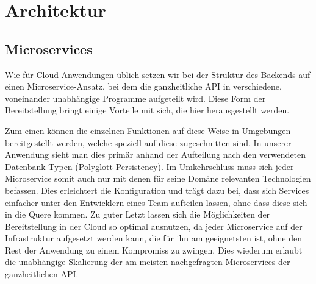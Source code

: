 \documentclass{article}
\begin{document}
\section{Architektur} %
\subsection{Microservices}

Wie für Cloud-Anwendungen üblich setzen wir bei der Struktur des Backends auf einen Microservice-Ansatz, bei dem die ganzheitliche API in verschiedene, voneinander unabhängige Programme aufgeteilt wird. Diese Form der Bereitstellung bringt einige Vorteile mit sich, die hier herausgestellt werden.

Zum einen können die einzelnen Funktionen auf diese Weise in Umgebungen bereitgestellt werden, welche speziell auf diese zugeschnitten sind. In unserer Anwendung sieht man dies primär anhand der Aufteilung nach den verwendeten Datenbank-Typen (Polyglott Persistency). Im Umkehrschluss muss sich jeder Microservice somit auch nur mit denen für seine Domäne relevanten Technologien befassen. Dies erleichtert die Konfiguration und trägt dazu bei, dass sich Services einfacher unter den Entwicklern eines Team aufteilen lassen, ohne dass diese sich in die Quere kommen. Zu guter Letzt lassen sich die Möglichkeiten der Bereitstellung in der Cloud so optimal ausnutzen, da jeder Microservice auf der Infrastruktur aufgesetzt werden kann, die für ihn am geeignetsten ist, ohne den Rest der Anwendung zu einem Kompromiss zu zwingen. Dies wiederum erlaubt die unabhängige Skalierung der am meisten nachgefragten Microservices der ganzheitlichen API. 
\end{document}

